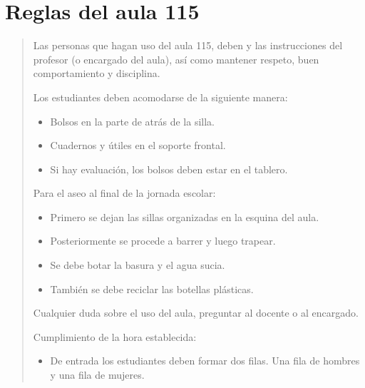 \documentclass[letterpaper,10pt,spanish]{sphinxmanual}
\begin{document}
\section{Reglas del aula 115}
\label{\detokenize{0_intro/reglas:reglas-del-aula-115}}\begin{quote}\begin{description}
\sphinxAtStartPar
Las personas que hagan uso del aula 115, deben  y  las instrucciones del profesor (o encargado del aula), así como mantener respeto, buen comportamiento y disciplina.

\sphinxAtStartPar
Los estudiantes deben acomodarse de la siguiente manera:
\begin{itemize}
\item {} 
\sphinxAtStartPar
Bolsos en la parte de atrás de la silla.

\item {} 
\sphinxAtStartPar
Cuadernos y útiles en el soporte frontal.

\item {} 
\sphinxAtStartPar
Si hay evaluación, los bolsos deben estar en el tablero.

\end{itemize}

\sphinxAtStartPar
Para el aseo al final de la jornada escolar:
\begin{itemize}
\item {} 
\sphinxAtStartPar
Primero se dejan las sillas organizadas en la esquina del aula.

\item {} 
\sphinxAtStartPar
Posteriormente se procede a barrer y luego trapear.

\item {} 
\sphinxAtStartPar
Se debe botar la basura y el agua sucia.

\item {} 
\sphinxAtStartPar
También se debe reciclar las botellas plásticas.

\end{itemize}

\sphinxAtStartPar
Cualquier duda sobre el uso del aula, preguntar al docente o al encargado.

\sphinxAtStartPar
Cumplimiento de la hora establecida:
\begin{itemize}
\item {} 
\sphinxAtStartPar
De entrada los estudiantes deben formar dos filas. Una fila de hombres y una fila de mujeres.


\end{itemize}
\end{description}
\end{quote}
\end{document}
